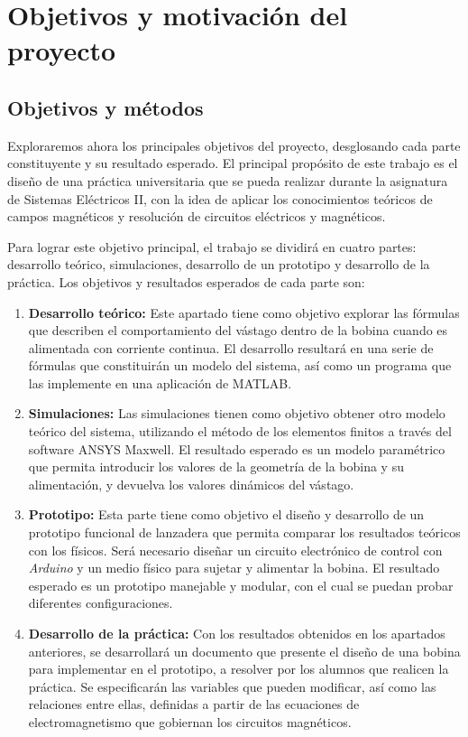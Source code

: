\section{Objetivos y motivación del proyecto}
\label{sec:motivacionyobjetivos}

\subsection{Objetivos y métodos}
Exploraremos ahora los principales objetivos del proyecto, desglosando cada parte constituyente y su resultado esperado. El principal propósito de este trabajo es el diseño de una práctica universitaria que se pueda realizar durante la asignatura de Sistemas Eléctricos II, con la idea de aplicar los conocimientos teóricos de campos magnéticos y resolución de circuitos eléctricos y magnéticos.

Para lograr este objetivo principal, el trabajo se dividirá en cuatro partes: desarrollo teórico, simulaciones, desarrollo de un prototipo y desarrollo de la práctica. Los objetivos y resultados esperados de cada parte son:

\begin{enumerate}
    \item \textbf{Desarrollo teórico:} Este apartado tiene como objetivo explorar las fórmulas que describen el comportamiento del vástago dentro de la bobina cuando es alimentada con corriente continua. El desarrollo resultará en una serie de fórmulas que constituirán un modelo del sistema, así como un programa que las implemente en una aplicación de MATLAB\textsuperscript{\textregistered}.
    \item \textbf{Simulaciones:} Las simulaciones tienen como objetivo obtener otro modelo teórico del sistema, utilizando el método de los elementos finitos a través del software ANSYS Maxwell\textsuperscript{\textregistered}. El resultado esperado es un modelo paramétrico que permita introducir los valores de la geometría de la bobina y su alimentación, y devuelva los valores dinámicos del vástago.
    \item \textbf{Prototipo:} Esta parte tiene como objetivo el diseño y desarrollo de un prototipo funcional de lanzadera que permita comparar los resultados teóricos con los físicos. Será necesario diseñar un circuito electrónico de control con \textit{Arduino\textregistered} y un medio físico para sujetar y alimentar la bobina. El resultado esperado es un prototipo manejable y modular, con el cual se puedan probar diferentes configuraciones.
    \item \textbf{Desarrollo de la práctica:} Con los resultados obtenidos en los apartados anteriores, se desarrollará un documento que presente el diseño de una bobina para implementar en el prototipo, a resolver por los alumnos que realicen la práctica. Se especificarán las variables que pueden modificar, así como las relaciones entre ellas, definidas a partir de las ecuaciones de electromagnetismo que gobiernan los circuitos magnéticos.
\end{enumerate}

